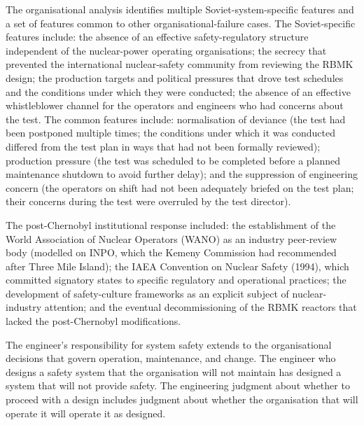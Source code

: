 The organisational analysis identifies multiple Soviet-system-specific features and a set of features common to other organisational-failure cases. The Soviet-specific features include: the absence of an effective safety-regulatory structure independent of the nuclear-power operating organisations; the secrecy that prevented the international nuclear-safety community from reviewing the RBMK design; the production targets and political pressures that drove test schedules and the conditions under which they were conducted; the absence of an effective whistleblower channel for the operators and engineers who had concerns about the test. The common features include: normalisation of deviance (the test had been postponed multiple times; the conditions under which it was conducted differed from the test plan in ways that had not been formally reviewed); production pressure (the test was scheduled to be completed before a planned maintenance shutdown to avoid further delay); and the suppression of engineering concern (the operators on shift had not been adequately briefed on the test plan; their concerns during the test were overruled by the test director).

The post-Chernobyl institutional response included: the establishment of the World Association of Nuclear Operators (WANO) as an industry peer-review body (modelled on INPO, which the Kemeny Commission had recommended after Three Mile Island); the IAEA Convention on Nuclear Safety (1994), which committed signatory states to specific regulatory and operational practices; the development of safety-culture frameworks as an explicit subject of nuclear-industry attention; and the eventual decommissioning of the RBMK reactors that lacked the post-Chernobyl modifications.

\begin{principle}
The engineer's responsibility for system safety extends to the organisational decisions that govern operation, maintenance, and change. The engineer who designs a safety system that the organisation will not maintain has designed a system that will not provide safety. The engineering judgment about whether to proceed with a design includes judgment about whether the organisation that will operate it will operate it as designed.
\end{principle}

